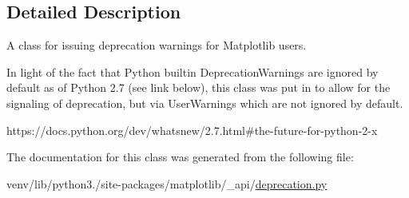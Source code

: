 \subsection{Detailed Description}
\begin{DoxyVerb}A class for issuing deprecation warnings for Matplotlib users.

In light of the fact that Python builtin DeprecationWarnings are ignored
by default as of Python 2.7 (see link below), this class was put in to
allow for the signaling of deprecation, but via UserWarnings which are not
ignored by default.

https://docs.python.org/dev/whatsnew/2.7.html#the-future-for-python-2-x
\end{DoxyVerb}
 

The documentation for this class was generated from the following file\+:\begin{DoxyCompactItemize}
\item 
venv/lib/python3./site-\/packages/matplotlib/\+\_\+api/\hyperlink{matplotlib_2__api_2deprecation_8py}{deprecation.\+py}\end{DoxyCompactItemize}
